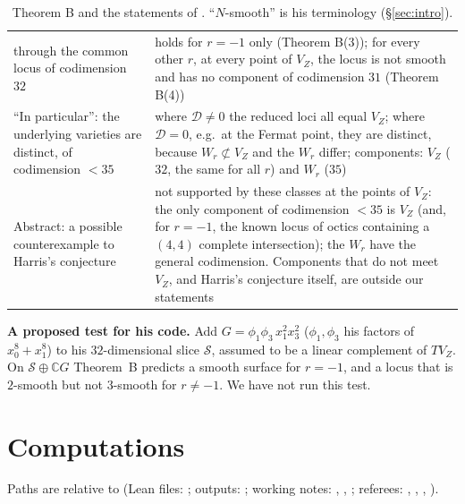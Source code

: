 \documentclass[11pt]{article}
\numberwithin{equation}{section}
\theoremstyle{remark}
\newcommand{\CC}{\mathbb{C}}
\newcommand{\VZ}{V_Z}
\newcommand{\cD}{\mathcal{D}}
\newcommand{\rg}{\raggedright}
\newcommand{\run}[1]{\medskip\noindent\textbf{#1}}
\begin{document}
\begin{table}[!t]
\begin{tabular}{@{}p{}p{}@{}}
 through the common locus of codimension $32$ & \rg holds for $r=-1$ only (Theorem B(3)); for every other $r$,
 at every point of $\VZ$, the locus is not smooth and has no component of codimension $31$
 (Theorem B(4))\tabularnewline
\rg ``In particular'': the underlying varieties are distinct, of codimension $<35$ & \rg where $\cD\ne0$ the
 reduced loci all equal $\VZ$; where $\cD=0$, e.g.\ at the Fermat point, they are distinct, because
 $W_r\not\subset\VZ$ and the $W_r$ differ; components: $\VZ$ ($32$, the same for all $r$) and $W_r$
 ($35$)\tabularnewline
\rg Abstract: a possible counterexample to Harris's conjecture & \rg not supported by these classes at the
 points of $\VZ$: the only component of codimension $<35$ is $\VZ$ (and, for $r=-1$, the known locus of octics
 containing a $(4,4)$ complete intersection); the $W_r$ have the general codimension. Components that do not
 meet $\VZ$, and Harris's conjecture itself, are outside our statements\tabularnewline
\bottomrule
\end{tabular}
\caption{Theorem B and the statements of \cite{Mo26}. ``$N$-smooth'' is his terminology (\S\ref{sec:intro}).}\label{tab:mov}
\end{table}

\run{A proposed test for his code.} Add $G=\phi_1\phi_3\,x_1^2x_3^2$ ($\phi_1,\phi_3$ his factors of
$x_0^8+x_1^8$) to his $32$-dimensional slice $\mathcal S$, assumed to be a linear complement of $T\VZ$. On
$\mathcal S\oplus\CC G$ Theorem~B predicts a smooth surface for $r=-1$, and a locus that is $2$-smooth but not
$3$-smooth for $r\ne-1$. We have not run this test.

\section{Computations}\label{sec:comp}

Paths are relative to  (Lean files: ; outputs: ; working
notes: , , ; referees:
, , , ).
\end{document}
